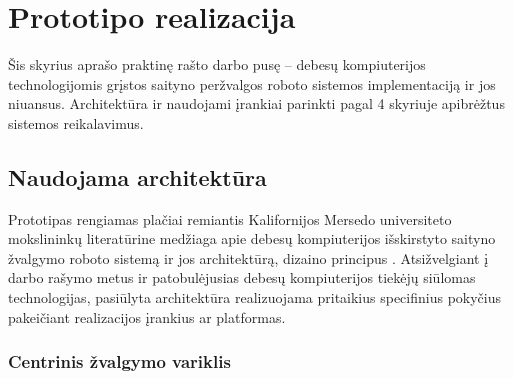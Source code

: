 \section{Prototipo realizacija}

Šis skyrius aprašo praktinę rašto darbo pusę -- debesų kompiuterijos technologijomis grįstos saityno peržvalgos roboto sistemos implementaciją ir jos niuansus. Architektūra ir naudojami įrankiai parinkti pagal 4 skyriuje apibrėžtus sistemos reikalavimus.

\subsection{Naudojama architektūra}

Prototipas rengiamas plačiai remiantis Kalifornijos Mersedo universiteto mokslininkų literatūrine medžiaga apie debesų kompiuterijos išskirstyto saityno žvalgymo roboto sistemą ir jos architektūrą, dizaino principus \cite{MercedCloudBasedWebCrawler}. Atsižvelgiant į darbo rašymo metus ir patobulėjusias debesų kompiuterijos tiekėjų siūlomas technologijas, pasiūlyta architektūra realizuojama pritaikius specifinius pokyčius pakeičiant realizacijos įrankius ar platformas.  



\subsubsection{Centrinis žvalgymo variklis}
 
